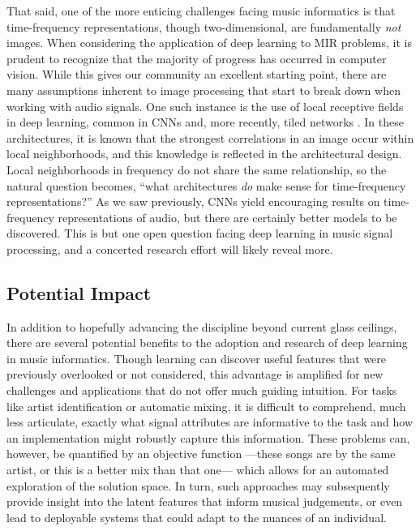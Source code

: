That said, one of the more enticing challenges facing music informatics is that time-frequency representations, though two-dimensional, are fundamentally \emph{not} images.
When considering the application of deep learning to MIR problems, it is prudent to recognize that the majority of progress has occurred in computer vision.
While this gives our community an excellent starting point, there are many assumptions inherent to image processing that start to break down when working with audio signals.
One such instance is the use of local receptive fields in deep learning, common in CNNs and, more recently, tiled networks \cite{Le2010}.
In these architectures, it is known that the strongest correlations in an image occur within local neighborhoods, and this knowledge is reflected in the architectural design.
Local neighborhoods in frequency do not share the same relationship, so the natural question becomes, ``what architectures \emph{do} make sense for time-frequency representations?''
As we saw previously, CNNs yield encouraging results on time-frequency representations of audio, but there are certainly better models to be discovered.
This is but one open question facing deep learning in music signal processing, and a concerted research effort will likely reveal more.


\subsection{Potential Impact}


In addition to hopefully advancing the discipline beyond current glass ceilings, there are several potential benefits to the adoption and research of deep learning in music informatics.
Though learning can discover useful features that were previously overlooked or not considered, this advantage is amplified for new challenges and applications that do not offer much guiding intuition.
For tasks like artist identification or automatic mixing, it is difficult to comprehend, much less articulate, exactly what signal attributes are informative to the task and how an implementation might robustly capture this information.
These problems can, however, be quantified by an objective function ---these songs are by the same artist, or this is a better mix than that one--- which allows for an automated exploration of the solution space.
In turn, such approaches may subsequently provide insight into the latent features that inform musical judgements, or even lead to deployable systems that could adapt to the nuances of an individual.

